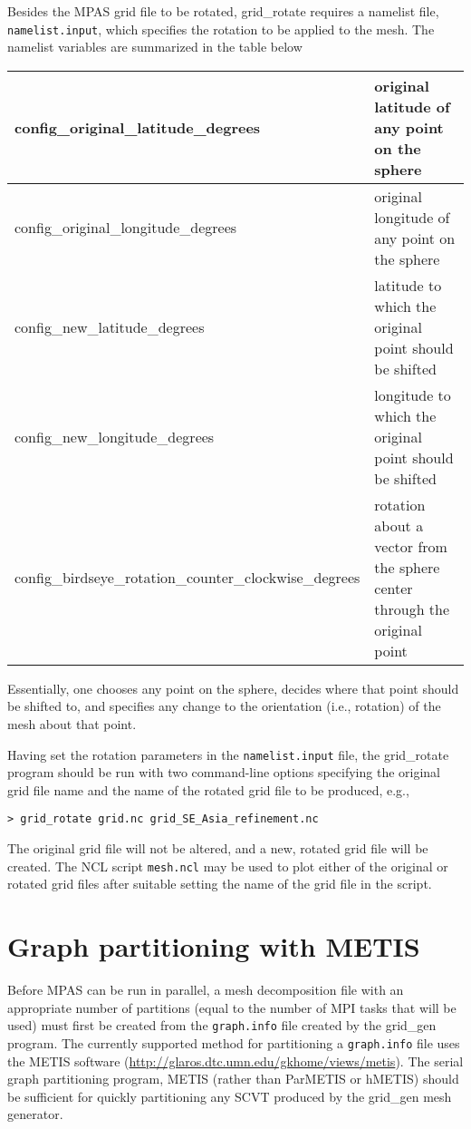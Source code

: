 Besides the MPAS grid file to be rotated, grid\_rotate requires a namelist file, {\tt namelist.input}, which specifies the rotation to be applied to the mesh. The namelist variables are summarized in the table below
   
\vspace{12pt}
\begin{longtable}{|p{3.25in} |p{2.5in}|}
\hline
config\_original\_latitude\_degrees & original latitude of any point on the sphere \\ \hline
config\_original\_longitude\_degrees & original longitude of any point on the sphere \\ \hline
config\_new\_latitude\_degrees &  latitude to which the original point should be shifted \\ \hline
config\_new\_longitude\_degrees &  longitude to which the original point should be shifted \\ \hline
config\_birdseye\_rotation\_counter\_clockwise\_degrees & rotation about a vector from the sphere center through the original point \\ \hline
\end{longtable}
\vspace{12pt}

\noindent Essentially, one chooses any point on the sphere, decides where that point should be shifted to,
and specifies any change to the orientation (i.e., rotation) of the mesh about that point. 

Having set the rotation parameters in the {\tt namelist.input} file, the grid\_rotate program should be run with two command-line options
specifying the original grid file name and the name of the rotated grid file to be produced, e.g.,

\vspace{12pt}
{\tt > grid\_rotate grid.nc grid\_SE\_Asia\_refinement.nc}
\vspace{12pt}

The original grid file will not be altered, and a new, rotated grid file will be created. The NCL script {\tt mesh.ncl} may be used to plot either of the original or rotated grid files after suitable setting the name of the grid file in the script.
   
   
\section{Graph partitioning with METIS} 
\label{sec:metis}

Before MPAS can be run in parallel, a mesh decomposition file with an appropriate number of 
partitions (equal to the number of MPI tasks that will be used) must first be created from the {\tt graph.info}
file created by the grid\_gen program. The currently supported method for partitioning a {\tt graph.info} file
uses the METIS software (\url{http://glaros.dtc.umn.edu/gkhome/views/metis}). The serial graph partitioning program, METIS (rather than ParMETIS or hMETIS) should be sufficient for quickly partitioning any SCVT produced by the grid\_gen mesh generator.


